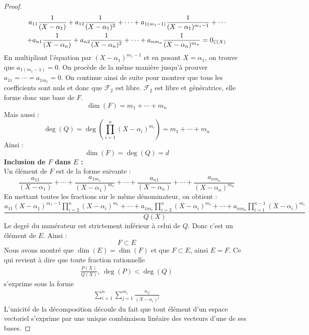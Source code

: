 \begin{proof}
\begin{align*}
        \begin{split}
            a_{11} \frac{1}{(X - \alpha_1)} + a_{12} \frac{1}{(X - \alpha_1)^2} + \cdots + a_{1(m_1 - 1)} \frac{1}{(X - \alpha_1)^{m_1 - 1}} + \cdots \\
            + a_{n1} \frac{1}{(X - \alpha_n)} + a_{n2} \frac{1}{(X - \alpha_n)^2} + \cdots + a_{nm_n} \frac{1}{(X - \alpha_n)^{m_n}} = 0_{\mathbb{C}(X)}
        \end{split}
    \end{align*}
    En multipliant l'équation par $(X - \alpha_1)^{m_1 - 1}$ et en posant $X = \alpha_1$, on trouve que $a_{1(m_1 - 1)} = 0$. On procède de la même manière jusqu'à prouver $a_{11} = \cdots = a_{1m_1} = 0$.
    On continue ainsi de suite pour montrer que tous les coefficients sont nuls et donc que $\mathcal{F}_2$ est libre. $\mathcal{F}_2$ est libre et génératrice, elle forme donc une base de $F$.
    \[ \dim(F) = m_1 + \cdots + m_n \]
    Mais aussi : 
    \[ \deg(Q) = \deg \left( \prod_{i=1}^{n} (X - \alpha_i)^{m_i} \right) = m_1 + \cdots + m_n \]
    Ainsi : \[ \dim(F) = \deg(Q) = d \]
    \textbf{Inclusion de $F$ dans $E$ :}
    \\
    Un élément de $F$ est de la forme suivante : 
    \[ \frac{a_{11}}{(X - \alpha_1)} + \cdots + \frac{a_{1m_1}}{(X - \alpha_1)^{m_1}} + \cdots + \frac{a_{n1}}{(X - \alpha_n)} + \cdots + \frac{a_{nm_n}}{(X - \alpha_n)^{m_n}} \]
    En mettant toutes les fractions sur le même dénominateur, on obtient :
    \[ \frac{a_{11}(X - \alpha_1)^{m_1 - 1} \prod_{i = 2}^{n}(X - \alpha_i)^{m_i} + \cdots + a_{1m_1} \prod_{i = 2}^{n}(X - \alpha_i)^{m_i} + \cdots + a_{nm_n} \prod_{i = 1}^{n - 1}(X - \alpha_i)^{m_i}}{Q(X)} \]
    Le degré du numérateur est strictement inférieur à celui de $Q$. Donc c'est un élément de $E$. Ainsi :
    \[ F \subset E \]
    Nous avons montré que $\dim(E) = \dim(F)$ et que $F \subset E$, ainsi $E = F$.
    Ce qui revient à dire que toute fraction rationnelle 
    \begin{align*}
        \frac{P(X)}{Q(X)},\ \deg(P) < \deg(Q)
    \end{align*}
    s'exprime sous la forme 
    \begin{align*}
        \sum_{i=1}^n \sum_{j = 1}^{m_i} \frac{a_{ij}}{(X - \alpha_i)^j}
    \end{align*}
    L'unicité de la décomposition découle du fait que tout élément d'un espace vectoriel s'exprime par une unique combinaison linéaire des vecteurs d'une de ses bases.
\end{proof}